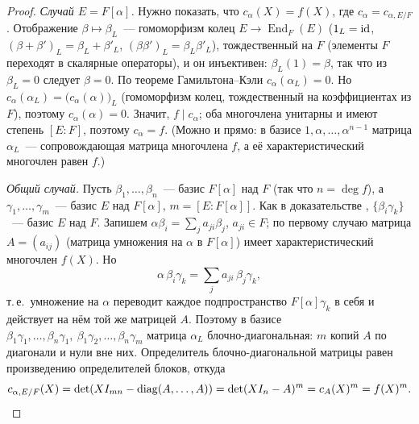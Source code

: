 \begin{proof}
\emph{Случай $E=F[\alpha]$.} Нужно показать, что $c_\alpha(X)=f(X)$, где $c_\alpha=c_{\alpha,E/F}$. Отображение
$\beta\mapsto\beta_L$~--- гомоморфизм колец $E\to\operatorname{End}_F(E)$ ($1_L=\operatorname{id}$, $(\beta+\beta')_L=\beta_L+\beta'_L$,
$(\beta\beta')_L=\beta_L\beta'_L$), тождественный на $F$ (элементы $F$ переходят в скалярные операторы), и он инъективен:
$\beta_L(1)=\beta$, так что из $\beta_L=0$ следует $\beta=0$. По теореме Гамильтона--Кэли $c_\alpha(\alpha_L)=0$. Но
$c_\alpha(\alpha_L)=\bigl(c_\alpha(\alpha)\bigr)_L$ (гомоморфизм колец, тождественный на коэффициентах из $F$), поэтому
$c_\alpha(\alpha)=0$. Значит, $f\mid c_\alpha$; оба многочлена унитарны и имеют степень $[E:F]$, поэтому $c_\alpha=f$.
(Можно и прямо: в базисе $1,\alpha,\dots,\alpha^{n-1}$ матрица $\alpha_L$~--- сопровождающая матрица многочлена $f$, а её
характеристический многочлен равен $f$.)

\emph{Общий случай.} Пусть $\beta_1,\dots,\beta_n$~--- базис $F[\alpha]$ над $F$ (так что $n=\deg f$), а
$\gamma_1,\dots,\gamma_m$~--- базис $E$ над $F[\alpha]$, $m=[E:F[\alpha]]$. Как в доказательстве ,
$\{\beta_i\gamma_k\}$~--- базис $E$ над $F$. Запишем $\alpha\beta_i=\sum_ja_{ji}\beta_j$, $a_{ji}\in F$; по первому случаю
матрица $A=(a_{ij})$ (матрица умножения на $\alpha$ в $F[\alpha]$) имеет характеристический многочлен $f(X)$. Но
\[
\alpha\,\beta_i\gamma_k=\sum_ja_{ji}\,\beta_j\gamma_k,
\]
т.\,е.\ умножение на $\alpha$ переводит каждое подпространство $F[\alpha]\gamma_k$ в себя и действует на нём той же
матрицей $A$. Поэтому в базисе $\beta_1\gamma_1,\dots,\beta_n\gamma_1,\ \beta_1\gamma_2,\dots,\beta_n\gamma_m$ матрица $\alpha_L$
блочно-диагональная: $m$ копий $A$ по диагонали и нули вне них. Определитель блочно-диагональной матрицы равен
произведению определителей блоков, откуда
\[
c_{\alpha,E/F}(X)=\det(XI_{mn}-\operatorname{diag}(A,\dots,A))=\det(XI_n-A)^m=c_A(X)^m=f(X)^m. \qedhere
\]
\end{proof}

\begin{keepfig}
\begin{center}
\end{center}
\end{keepfig}

